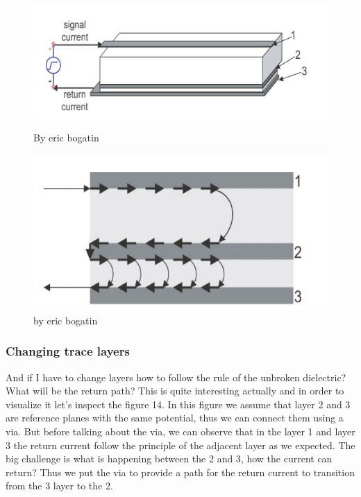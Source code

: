 \documentclass[final]{cubedoc}
\begin{document}
	\begin{figure}[h!]
		\centering
		\begin{minipage}[b]{0.4\textwidth}
			\includegraphics[keepaspectratio, width=\textwidth]{assets/broken_dielectric.png}
			\caption{By eric bogatin}
		\end{minipage}
		\hfill
		\begin{minipage}[b]{0.4\textwidth}
			\includegraphics[width=\textwidth]{assets/side_current.png}
			\caption{by eric bogatin}
		\end{minipage}
	\end{figure}
	
	\subsubsection{Changing trace layers}
	
	And if I have to change layers how to follow the rule of the unbroken dielectric? What will be the return path? This is quite interesting actually and in order to visualize it let's inspect the figure 14.	In this figure we assume that layer 2 and 3 are reference planes with the same potential, thus we can connect them using a via. But before talking about the via, we can observe that in the layer 1 and layer 3 the return current follow the principle of the adjacent layer as we expected. The big challenge is what is happening between the 2 and 3, how the current can return? Thus we put the via to provide a path for the return current to transition from the 3 layer to the 2.
	
\end{document}
